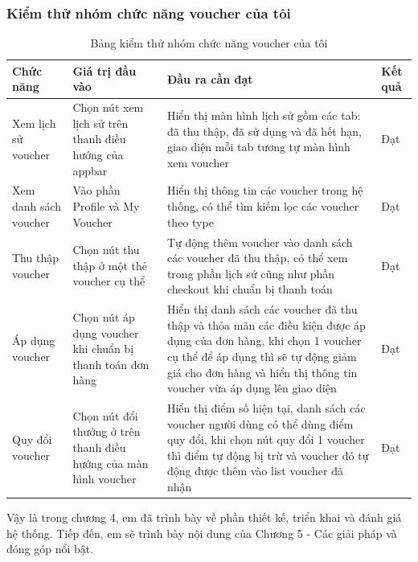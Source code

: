 \documentclass[../DoAn.tex]{subfiles}
\begin{document}
\subsubsection{Kiểm thử nhóm chức năng voucher của tôi}
\renewcommand{\arraystretch}{1.3}
\begin{longtable}{|p{3cm}|p{3.5cm}|p{6.5cm}|>{\centering\arraybackslash}p{1.5cm}|}
\caption{Bảng kiểm thử nhóm chức năng voucher của tôi} \label{tab:myVoucherTest} \\
\hline
\textbf{Chức năng} & \textbf{Giá trị đầu vào} & \textbf{Đầu ra cần đạt} & \textbf{Kết quả} \\ \hline
\endfirsthead
\endhead
\hline
Xem lịch sử voucher & Chọn nút xem lịch sử trên thanh điều hướng của appbar & Hiển thị màn hình lịch sử gồm các tab: đã thu thập, đã sử dụng và đã hết hạn, giao diện mỗi tab tương tự màn hình xem voucher & Đạt \\ \hline
Xem danh sách voucher & Vào phần Profile và My Voucher & Hiển thị thông tin các voucher trong hệ thống, có thể tìm kiếm lọc các voucher theo type & Đạt \\ \hline
Thu thập voucher & Chọn nút thu thập ở một thẻ voucher cụ thể & Tự động thêm voucher vào danh sách các voucher đã thu thập, có thể xem trong phần lịch sử cũng như phần checkout khi chuẩn bị thanh toán & Đạt \\ \hline
Áp dụng voucher & Chọn nút áp dụng voucher khi chuẩn bị thanh toán đơn hàng & Hiển thị danh sách các voucher đã thu thập và thỏa mãn các điều kiện được áp dụng của đơn hàng, khi chọn 1 voucher cụ thể để áp dụng thì sẽ tự động giảm giá cho đơn hàng và hiển thị thông tin voucher vừa áp dụng lên giao diện & Đạt \\ \hline
Quy đổi voucher & Chọn nút đổi thưởng ở trên thanh điều hướng của màn hình voucher & Hiển thị điểm số hiện tại, danh sách các voucher người dùng có thể dùng điểm quy đổi, khi chọn nút quy đổi 1 voucher thì điểm tự động bị trừ và voucher đó tự động được thêm vào list voucher đã nhận & Đạt \\ \hline
\end{longtable}

Vậy là trong chương 4, em đã trình bày về phần thiết kế, triển khai và đánh giá hệ thống. Tiếp đến, em sẽ trình bày nội dung của Chương  5 - Các giải pháp và đóng góp nổi bật.
\end{document}
